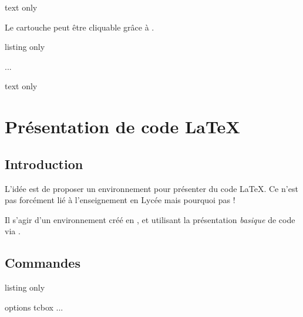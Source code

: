 \begin{PresCodeSortiePL}{text only}



\end{PresCodeSortiePL}

\begin{noteblock}
Le \textsf{cartouche} peut être \og cliquable \fg{} grâce à .
\end{noteblock}

\begin{PresCodeTexPL}{listing only}
\usepackage{hyperref}
...
\href{https://capytale2.ac-paris.fr/web/c/abcd-12345}{}
\end{PresCodeTexPL}

\begin{PresCodeSortiePL}{text only}
\href{https://capytale2.ac-paris.fr/web/c/abcd-12345}{}
\end{PresCodeSortiePL}

\newpage

\section{Présentation de code \LaTeX}\label{prescode}

\subsection{Introduction}

\begin{tipblock}
 L'idée est de proposer un environnement pour présenter du code \LaTeX. Ce n'est pas forcément lié à l'enseignement en Lycée mais pourquoi pas !

\smallskip

Il s'agir d'un environnement créé en , et utilisant la présentation \textit{basique} de code via .
\end{tipblock}

\subsection{Commandes}

\begin{PresCodeTexPL}{listing only}
\begin{PresentationCode}[Couleur]{options tcbox}
...
\end{PresentationCode}
\end{PresCodeTexPL}

